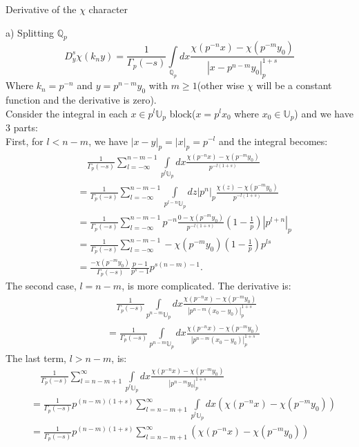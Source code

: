 \documentclass[12pt]{article}
\begin{document}
\begin{section}{Derivative of the $\chi$ character}
\begin{paragraph}{a) Splitting $\mathbb{Q}_p$}
\begin{equation}
D^s_y \chi(k_n y)=\frac{1}{\Gamma_p (-s)} \int\limits _{\mathbb{Q}_p}dx \frac{\chi( p^{-n} x) - \chi( p^{-m}y_0)}{|x-p^{n-m}y_0|_p^{1+s}}
\end{equation}
Where $k_n=p^{-n}$ and $y=p^{n-m} y_0$ with $m\geq 1$(other wise $\chi$ will be a constant function and the derivative is zero).\\
Consider the integral in each $x\in p^l \mathbb{U}_p$ block($x=p^l x_0$ where $x_0\in \mathbb{U}_p$) and we have 3 parts:\\
First, for $l<n-m$, we have $|x-y|_p=|x|_p=p^{-l}$ and the integral becomes:
\begin{equation}
\begin{split}
&\quad\frac{1}{\Gamma_p(-s)}\sum_{l=-\infty}^{n-m-1} \int\limits _{p^l \mathbb{U}_p}dx \frac{\chi( p^{-n} x) - \chi( p^{-m}y_0)}{p^{-l(1+s)}}\\\
&= \frac{1}{\Gamma_p(-s)}\sum_{l=-\infty}^{n-m-1} \int\limits _{p^{l-n} \mathbb{U}_p}dz |p^n|_p \frac{\chi(z) - \chi( p^{-m}y_0)}{p^{-l(1+s)}} \\
&= \frac{1}{\Gamma_p(-s)}\sum_{l=-\infty}^{n-m-1} p^{-n} \frac{0 - \chi( p^{-m}y_0)}{p^{-l(1+s)}} (1-\frac{1}{p}) |p^{l+n}|_p \\
&= \frac{1}{\Gamma_p(-s)}\sum_{l=-\infty}^{n-m-1} - \chi( p^{-m}y_0)(1-\frac{1}{p})p^{ls}\\
&= \frac{- \chi( p^{-m}y_0)}{\Gamma_p(-s)} \frac{p-1}{p^s-1} p^{s(n-m)-1}.
\end{split}
\end{equation}
The second case, $l=n-m$, is more complicated. The derivative is:
\begin{equation}
\begin{split}
&\quad\frac{1}{\Gamma_p (-s)} \int\limits _{p^{n-m}\mathbb{U}_p}dx\frac{\chi( p^{-n} x) - \chi( p^{-m}y_0)}{|p^{n-m}(x_0-y_0)|_p^{1+s}}\\
&=\frac{1}{\Gamma_p (-s)} \int\limits _{p^{n-m}\mathbb{U}_p}dx\frac{\chi( p^{-n} x) - \chi( p^{-m}y_0)}{|p^{n-m}(x_0-y_0)|_p^{1+s}}
\end{split}
\end{equation}
The last term, $l>n-m$, is:
\begin{equation}
\begin{split}
&\quad\frac{1}{\Gamma_p (-s)} \sum_{l=n-m+1}^{\infty} \int\limits _{p^l \mathbb{U}_p}dx\frac{\chi( p^{-n} x) - \chi( p^{-m}y_0)}{|p^{n-m}y_0|_p^{1+s}}\\
&=\frac{1}{\Gamma_p (-s)} p^{(n-m)(1+s)} \sum_{l=n-m+1}^{\infty} \int\limits _{p^l \mathbb{U}_p}dx (\chi( p^{-n} x) - \chi( p^{-m}y_0))\\
&=\frac{1}{\Gamma_p (-s)} p^{(n-m)(1+s)} \sum_{l=n-m+1}^{\infty} (\chi( p^{-n} x) - \chi( p^{-m}y_0))
\end{split}
\end{equation}
\end{paragraph}

\end{section}
\end{document}
